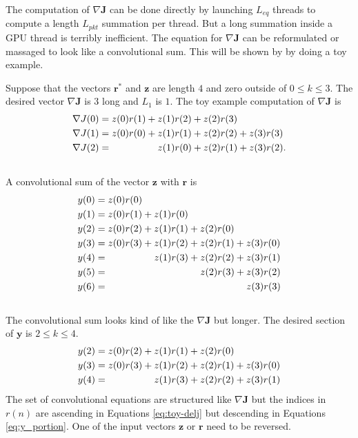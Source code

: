 The computation of $\nabla \mathbf{J}$ can be done directly by launching $L_{eq}$ threads to compute a length $L_{pkt}$ summation per thread.
But a long summation inside a GPU thread is terribly inefficient.
The equation for $\nabla \mathbf{J}$ can be reformulated or massaged to look like a convolutional sum.
This will be shown by by doing a toy example.

Suppose that the vectors $\mathbf{r}^\ast$ and $\mathbf{z}$ are length $4$ and zero outside of $0 \leq k \leq 3$. 
The desired vector $\nabla \mathbf{J}$ is $3$ long and $L_1$ is $1$.
The toy example computation of $\nabla \mathbf{J}$ is
\begin{align}
\nabla J(0) &= z(0)r(1)				+z(1)r(2) +z(2)r(3)				\\ \nonumber
\nabla J(1) &= z(0)r(0)				+z(1)r(1) +z(2)r(2)	+z(3)r(3)	\\ \nonumber
\nabla J(2) &= \indent\indent\indent\;  z(1)r(0) +z(2)r(1) +z(3)r(2).	\\ \nonumber
\label{eq:toy-delj}
\end{align}
A convolutional sum of the vector $\mathbf{z}$ with $\mathbf{r}$ is
\begin{align}
y(0) &= z(0)r(0)																		\\\nonumber
y(1) &= z(0)r(1) 				+z(1)r(0)													\\ \nonumber
y(2) &= z(0)r(2) 				+z(1)r(1) 				+z(2)r(0)							\\ \nonumber
y(3) &= z(0)r(3) 				+z(1)r(2) 				+z(2)r(1) 				+z(3)r(0) 	\\ \nonumber
y(4) &= \indent\indent\indent\;  z(1)r(3) 				+z(2)r(2) 				+z(3)r(1) \\ \nonumber
y(5) &= \indent\indent\indent\indent\indent\indent\>\,\, z(2)r(3) 				+z(3)r(2) \\ \nonumber
y(6) &= \indent\indent\indent\indent\indent\indent\indent\indent\indent\;\;\;		 z(3)r(3) \\ \nonumber
\label{eq:toy-conv}
\end{align}
The convolutional sum looks kind of like the $\nabla \mathbf{J}$ but longer.
The desired section of $\mathbf{y}$ is $2 \leq k \leq 4$.
\begin{align}
y(2) &= z(0)r(2) 				+z(1)r(1) 				+z(2)r(0)							\\ \nonumber
y(3) &= z(0)r(3) 				+z(1)r(2) 				+z(2)r(1) 				+z(3)r(0) 	\\ \nonumber
y(4) &= \indent\indent\indent\;  z(1)r(3) 				+z(2)r(2) 				+z(3)r(1)  \nonumber
\label{eq:y_portion}
\end{align}
The set of convolutional equations are structured like $\nabla \mathbf{J}$ but the indices in $r(n)$ are ascending in Equations \eqref{eq:toy-delj} but descending in Equations \eqref{eq:y_portion}.
One of the input vectors $\mathbf{z}$ or $\mathbf{r}$ need to be reversed.

